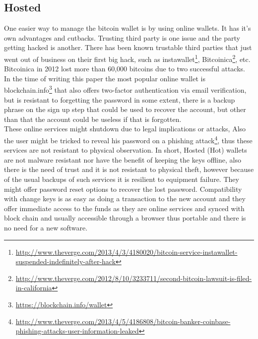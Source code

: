 \subsection{Hosted} 
One easier way to manage the bitcoin wallet is by using online wallets. It has it's own advantages and cutbacks. Trusting third party is one issue and the party getting hacked is another. There has been known trustable third parties that just went out of business on their first big hack, such as instawallet\footnote{\url{http://www.theverge.com/2013/4/3/4180020/bitcoin-service-instawallet-suspended-indefinitely-after-hack}}, Bitcoinica\footnote{\url{http://www.theverge.com/2012/8/10/3233711/second-bitcoin-lawsuit-is-filed-in-california}}, etc. Bitcoinica in 2012 lost more than 60,000 bitcoins due to two successful attacks.\\
In the time of writing this paper the most popular online wallet is blockchain.info\footnote{\url{https://blockchain.info/wallet}} that also offers two-factor authentication via email verification, but is resistant to forgetting the password in some extent, there is a backup phrase on the sign up step that could be used to recover the account, but other than that the account could be useless if that is forgotten.\\ These online services might shutdown due to legal implications or attacks, Also the user might be tricked to reveal his password on a phishing attack\footnote{\url{http://www.theverge.com/2013/4/5/4186808/bitcoin-banker-coinbase-phishing-attacks-user-information-leaked}}, thus these services are not resistant to physical observation.
In short, Hosted (Hot) wallets are not malware resistant nor have the benefit of keeping the keys offline, also there is the need of trust and it is not resistant to physical theft, however because of the usual backups of such services it is resilient to equipment failure. They might offer password reset options to recover the lost password. Compatibility with change keys is as easy as doing a transaction to the new account and they offer immediate access to the funds as they are online services and synced with block chain and usually accessible through a browser thus portable and there is no need for a new software.



